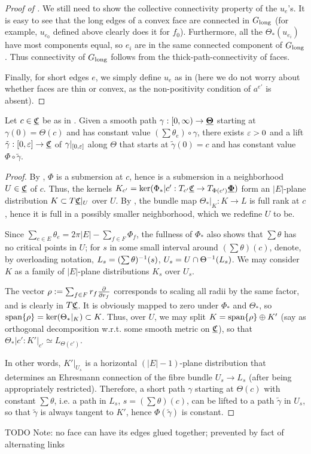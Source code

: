 \begin{proof}[Proof of ]
We still need to show the collective connectivity property of the $u_e$'s.
It is easy to see that the long edges of a convex face
are connected in $G_{\text{long}}$
(for example, $u_{e_0}$ defined above clearly does it for
$f_0$).
Furthermore, all the $\Theta_*(u_{e_i})$ have most components equal,
so $e_i$ are in the same connected component of $G_{\text{long}}$.
Thus connectivity of $G_{\text{long}}$ follows from the
thick-path-connectivity of faces.


Finally, for short edges $e$, we simply define $u_e$
as in 
(here we do not worry about whether faces are thin or convex,
as the non-positivity condition of $a^{e'}$ is absent).
\end{proof}


\begin{proposition}
\label{p:nghd_lift}
Let $c\in {\underline{\mathfrak{C}}}$ be as in .
Given a smooth path $\gamma: [0,\infty) \to {\underline{\mathbf{\Theta}}}$
starting at $\gamma(0) = \Theta(c)$
and has constant value $(\sum \theta_e) \circ \gamma$,
there exists $\varepsilon > 0$ and a lift $\tilde{\gamma} :[0, \varepsilon] \to {\underline{\mathfrak{C}}}$
of $\gamma|_{[0,\varepsilon]}$ along $\Theta$
that starts at $\tilde{\gamma}(0) = c$
and has constant value $\Phi \circ \tilde{\gamma}$.
\end{proposition}


\begin{proof}
By , $\Phi$ is a submersion at $c$,
hence is a submersion in a neighborhood $U \in {\underline{\mathfrak{C}}}$ of $c$.
Thus, the kernels
$K_{c'} = \ker(\Phi_*|{c'} : T_{c'} {\underline{\mathfrak{C}}} \to T_{\Phi(c')} {\underline{\mathbf{\Phi}}})$
form an $|E|$-plane distribution $K \subset T{\underline{\mathfrak{C}}}|_U$ over $U$.
By , the bundle map
$\Theta_*|_K : K \to L$ is full rank at $c$,
hence it is full in a possibly smaller neighborhood,
which we redefine $U$ to be.


Since $\sum_{e \in E} \theta_e = 2\pi |E| - \sum_{f\in F} \Phi_f$,
the fullness of $\Phi_*$ also shows that
$\sum \theta$ has no critical points in $U$;
for $s$ in some small interval around $(\sum \theta)(c)$,
denote, by overloading notation,
$L_s = (\sum \theta)^{-1} (s)$,
$U_s = U \cap \Theta^{-1}(L_s)$.
We may consider $K$ as a family of $|E|$-plane distributions
$K_s$ over $U_s$.


The vector $\rho := \sum_{f\in F} r_f {\frac{\partial}{\partial r_f}}$ corresponds to
scaling all radii by the same factor, and is clearly in $T{\underline{\mathfrak{C}}}$.
It is obviously mapped to zero under $\Phi_*$ and $\Theta_*$,
so ${\text{span}}\{\rho\} = \ker(\Theta_*|_K) \subset K$.
Thus, over $U$, we may split
$K = {\text{span}}\{\rho\} \oplus K'$
(say as orthogonal decomposition w.r.t. some smooth metric on ${\underline{\mathfrak{C}}}$),
so that $\Theta_*|{c'} : K'|_{c'} \simeq L_{\Theta(c')}$.


In other words, $K'|_{U_s}$ is a horizontal $(|E|-1)$-plane distribution
that determines an Ehresmann connection of the
fibre bundle $U_s \to L_s$ (after being appropriately restricted).
Therefore, a short path $\gamma$ starting at $\Theta(c)$
with constant $\sum \theta$, i.e. a path in $L_s$, $s ={(\sum \theta)(c)}$,
can be lifted to a path $\tilde{\gamma}$ in $U_s$,
so that $\tilde{\gamma}$ is always tangent to $K'$,
hence $\Phi(\tilde{\gamma})$ is constant.
\end{proof}



TODO
Note: no face can have its edges glued together; prevented by fact
of alternating links

